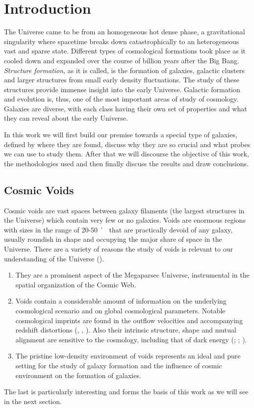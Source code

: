 \chapter{\label{intro}Introduction}

\setcounter{equation}{0}
\setcounter{table}{0}
\setcounter{figure}{0}

\vspace{5mm}
The Universe came to be from an homogeneous hot dense phase, a gravitational singularity where spacetime breaks down catastrophically to an heterogeneous vast and sparse state. Different types of cosmological formations took place as it cooled down and expanded over the course of billion years after the Big Bang. \textit{Structure formation}, as it is called, is the formation of galaxies, galactic clusters and larger structures from small early density fluctuations. The study of these structures provide immense insight into the early Universe. 
Galactic formation and evolution is, thus, one of the most important areas of study of cosmology. Galaxies are diverse, with each class having their own set of properties and what they can reveal about the early Universe.
\par
In this work we will first build our premise towards a special type of galaxies, defined by where they are found, discuss why they are so crucial and what probes we can use to study them. After that we will discourse the objective of this work, the methodologies used and then finally discuss the results and draw conclusions. 
\section{Cosmic Voids}
Cosmic voids are vast spaces between galaxy filaments (the largest structures in the Universe) which contain very few or no galaxies. Voids are enormous regions with sizes in the range of 20-50 \si{\per \h \mega \parsec} that are practically devoid of any galaxy, usually roundish in shape and occupying the major share of space in the Universe. There are a variety of reasons the study of voids is relevant to our understanding of the Universe (\cite{van_de_weygaert_cosmic_2011}).
\begin{enumerate}
	\item They are a prominent aspect of the Megaparsec Universe, instrumental in the spatial organization of the Cosmic Web.
	\item Voids contain a considerable amount of information on the underlying cosmological scenario and on global cosmological parameters. Notable cosmological imprints are found in the outflow velocities and accompanying redshift distortions (\cite{dekel_omega_1994}, \cite{martel_simulation_1989}, \cite{ryden_voids_1996}). Also their intrinsic structure, shape and mutual alignment are sensitive to the cosmology, including that of dark energy (\cite{park_void_2007}; \cite{lee_constraining_2009}; \cite{platen_alignment_2008}).
	\item The pristine low-density environment of voids represents an ideal and pure setting for the study of galaxy formation and the influence of cosmic environment on the formation of galaxies.
\end{enumerate}
The last is particularly interesting and forms the basis of this work as we will see in the next section.
